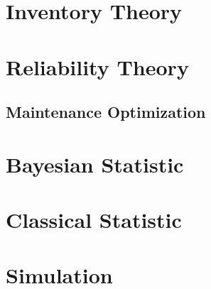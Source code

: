 \documentclass[10pt]{book}
\begin{document}
	\part{Inventory Theory}

	\part{Reliability Theory}

		\chapter{Maintenance Optimization}

	\part{Bayesian Statistic}

	\part{Classical Statistic}

	\part{Simulation}
\end{document}
